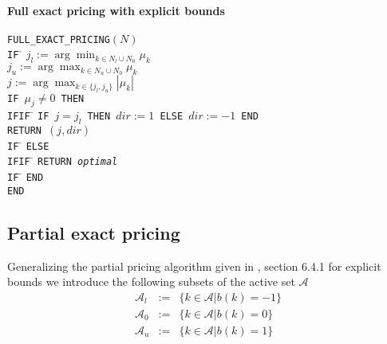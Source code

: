 \documentclass[a4paper]{article}
\begin{document}
\paragraph{Full exact pricing with explicit bounds}
\begin{tabbing}
\texttt{FULL\_EXACT\_PRICING$(N)$} \\
\texttt{IF} \= \kill
\> \texttt{$j_{l}:=\arg\min_{k \in N_{l} \cup
                               N_{0}}\mu_{k}$}  \\
\> \texttt{$j_{u}:=\arg\max_{k \in N_{u} \cup
                               N_{0}}\mu_{k}$}  \\
\> \texttt{$j:=\arg\max_{k \in \{j_{l}, j_{u}\}}\left|\mu_{k}\right|$}  \\
\> \texttt{IF $\mu_{j} \neq 0$ THEN} \\
\texttt{IFIF} \= \kill
\> \texttt{IF $j = j_{l}$ THEN $dir:=1$ ELSE $dir:=-1$ END} \\
\> \texttt{RETURN $(j, dir)$} \\
\texttt{IF} \= \kill
\> \texttt{ELSE} \\
\texttt{IFIF} \= \kill
\> \texttt{RETURN \emph{optimal}} \\
\texttt{IF} \= \kill
\> \texttt{END} \\
\texttt{END}
\end{tabbing}


\subsection{Partial exact pricing}
Generalizing the partial pricing algorithm given in \cite{Sven}, section 6.4.1 for explicit bounds we introduce the following subsets of the active set $\mathcal{A}$ 
\begin{eqnarray}
\mathcal{A}_{l}&:=&\{k \in \mathcal{A}\left|\right. b\left(k\right)=-1\} \\
\mathcal{A}_{0}&:=&\{k \in \mathcal{A}\left|\right. b\left(k\right)=0\} \\
\mathcal{A}_{u}&:=&\{k \in \mathcal{A}\left|\right. b\left(k\right)=1\}
\end{eqnarray}
\end{document}
